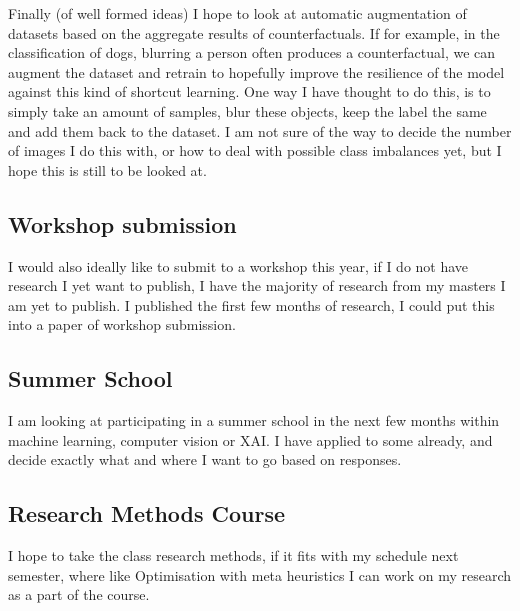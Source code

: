 Finally (of well formed ideas) I hope to look at automatic augmentation of datasets based on the aggregate results of counterfactuals. If for example, in the classification of dogs, blurring a person often produces a counterfactual, we can augment the dataset and retrain to hopefully improve the resilience of the model against this kind of shortcut learning. One way I have thought to do this, is to simply take an amount of samples, blur these objects, keep the label the same and add them back to the dataset. I am not sure of the way to decide the number of images I do this with, or how to deal with possible class imbalances yet, but I hope this is still to be looked at. \\

\subsection{Workshop submission}

I would also ideally like to submit to a workshop this year, if I do not have research I yet want to publish, I have the majority of research from my masters I am yet to publish. I published the first few months of research, I could put this into a paper of workshop submission. \\

\subsection{Summer School}

I am looking at participating in a summer school in the next few months within machine learning, computer vision or XAI. I have applied to some already, and decide exactly what and where I want to go based on responses. \\

\subsection{Research Methods Course}

I hope to take the class research methods, if it fits with my schedule next semester, where like Optimisation with meta heuristics I can work on my research as a part of the course. \\